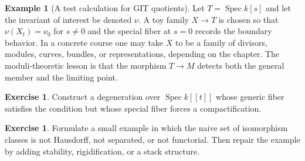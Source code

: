\documentclass[11pt]{amsart}
\theoremstyle{definition}
\newtheorem{example}[theorem]{Example}
\newtheorem{exercise}[theorem]{Exercise}
\newcommand{\Spec}{\operatorname{Spec}}
\begin{document}
\begin{example}[A test calculation for GIT quotients]
Let $T=\Spec k[s]$ and let the invariant of interest be denoted $\nu$.  A toy family $X\to T$ is chosen so that $\nu(X_t)=\nu_0$ for $s\ne0$ and the special fiber at $s=0$ records the boundary behavior.  In a concrete course one may take $X$ to be a family of divisors, modules, curves, bundles, or representations, depending on the chapter.  The moduli-theoretic lesson is that the morphism $T\to M$ detects both the general member and the limiting point.
\end{example}
\begin{exercise}
Construct a degeneration over $\Spec k[[t]]$ whose generic fiber satisfies the condition but whose special fiber forces a compactification.
\end{exercise}
\begin{exercise}
Formulate a small example in which the naive set of isomorphism classes is not Hausdorff, not separated, or not functorial.  Then repair the example by adding stability, rigidification, or a stack structure.
\end{exercise}
\clearpage
\end{document}
